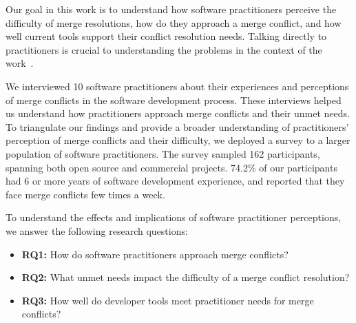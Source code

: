 Our goal in this work is to understand how software practitioners perceive the difficulty of merge resolutions, how do they approach a merge conflict, and how well current tools support their conflict resolution needs.
Talking directly to practitioners is crucial to understanding the problems in the context of the work~\cite{fritz2010using, sillito2006questions, de2008answering, ko2007information}.

We interviewed 10 software practitioners about their experiences and perceptions of merge conflicts in the software development process. These interviews helped us understand how practitioners approach merge conflicts and their unmet needs.
To triangulate our findings and provide a broader understanding of practitioners' perception of merge conflicts and their difficulty, we deployed a survey to a larger population of software practitioners.
The survey sampled 162 participants, spanning both open source and commercial projects. 74.2\% of our participants had 6 or more years of software development experience, and reported that they face merge conflicts few times a week.

To understand the effects and implications of software practitioner perceptions, we answer the following research questions:

\begin{itemize}
\item \textbf{RQ1:} How do software practitioners approach merge conflicts?
\item \textbf{RQ2:} What unmet needs impact the difficulty of a merge conflict resolution?
\item \textbf{RQ3:} How well do developer tools meet practitioner needs for merge conflicts?
\end{itemize}

